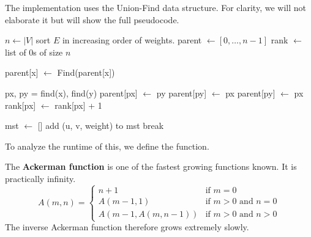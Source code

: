    \begin{algo}
      The implementation uses the Union-Find data structure. For clarity, we will not elaborate it but will show the full pseudocode. 
      \begin{algorithm}[H]
        \label{alg:kruskal}
        \begin{algorithmic}
          \State 
            \State $n \gets |V|$ 
            \State sort $E$ in increasing order of weights. 
            \State parent $\gets [0, \ldots, n-1]$ 
            \State rank $\gets$ list of $0$s of size $n$ 

              \State parent[x] $\gets$ Find(parent[x]) 
              \EndIf
              \State {}
            \EndFunction

              \State px, py = find(x), find(y) 
                \State {}
              \EndIf
                \State parent[px] $\gets$ py
                \State parent[py] $\gets$ px
              \Else{}
                \State parent[py] $\gets$ px 
                \State rank[px] $\gets$ rank[px] + 1
              \EndIf
              \State {}
            \EndFunction

            \State mst $\gets$ [] 
                \State add (u, v, weight) to mst
              \EndIf 
                \State break
              \EndIf 
            \EndFor

            \State {}
          \EndFunction
        \end{algorithmic}
      \end{algorithm}
    \end{algo}
    
    To analyze the runtime of this, we define the function. 

    \begin{definition}
      The \textbf{Ackerman function} is one of the fastest growing functions known. It is practically infinity. 
      \begin{equation}
        A(m,n) = 
        \begin{cases} 
          n+1 & \text{if } m = 0 \\
          A(m-1,1) & \text{if } m > 0 \text{ and } n = 0 \\
          A(m-1,A(m,n-1)) & \text{if } m > 0 \text{ and } n > 0
        \end{cases} 
      \end{equation}
      The inverse Ackerman function therefore grows extremely slowly. 
    \end{definition}

